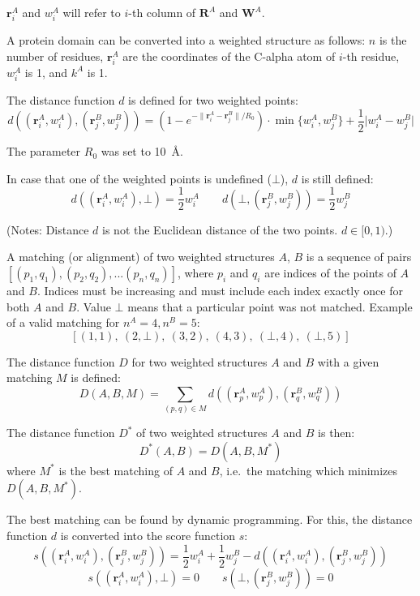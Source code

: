 \documentclass{article}
\begin{document}
\(\mathbf{r}^A_i\) and \(w^A_i\) will refer to \(i\)-th column of
\(\mathbf{R}^A\) and \(\mathbf{W}^A\).

A protein domain can be converted into a weighted structure as follows:
\(n\) is the number of residues, \(\mathbf{r}^A_i\) are the coordinates of the
C-alpha atom of \(i\)-th residue, \(w^A_i\) is 1, and \(k^A\) is 1.

The distance function \(d\) is defined for two weighted points:
  \[
    d \left( (\mathbf{r}^A_i, w^A_i), (\mathbf{r}^B_j, w^B_j) \right) 
    = \left( 1 - e^{-\lVert \mathbf{r}^A_i-\mathbf{r}^B_j \rVert / R_0} \right) \cdot \min\{ w^A_i, w^B_j \} + \frac{1}{2} \lvert w^A_i-w^B_j \rvert
  \]

The parameter \(R_0\) was set to 10~\AA.

In case that one of the weighted points is undefined (\(\bot\)), \(d\)
is still defined:
  \[
    d \left( (\mathbf{r}^A_i, w^A_i), \bot \right) = \frac{1}{2} w^A_i \qquad 
    d \left( \bot, (\mathbf{r}^B_j, w^B_j) \right) = \frac{1}{2} w^B_j
  \]

(Notes: Distance \(d\) is not the Euclidean distance of the two points.
\(d \in [0,1)\).)

A matching (or alignment) of two weighted structures \(A\), \(B\) is a sequence of
pairs \([(p_1, q_1), (p_2, q_2), \allowbreak ...\allowbreak(p_n, q_n)]\), 
where \(p_i\) and \(q_i\) are indices of the points of \(A\) and \(B\).
Indices must be increasing and must include each index exactly once for
both \(A\) and \(B\). Value \(\bot\) means that a particular point was
not matched. Example of a valid matching for \(n^A = 4, n^B = 5\):
  \[  [(1, 1),\ (2, \bot),\ (3, 2),\ (4, 3),\ (\bot, 4),\ (\bot, 5)]  \]
  
The distance function \(D\) for two weighted structures \(A\) and \(B\) with a given matching \(M\) is defined:
  \[  D(A, B, M) = \sum\limits_{(p, q) \in M}{d \left( (\mathbf{r}^A_{p}, w^A_{p}), (\mathbf{r}^B_{q}, w^B_{q}) \right)}  \]

  The distance function \(D^*\) of two weighted structures \(A\) and \(B\) is then:
  \[  D^*(A, B) = D(A, B, M^*)  \]
where \(M^*\) is the best matching of \(A\) and \(B\), i.e.~the matching which minimizes \(D(A, B, M^*)\).

The best matching can be found by dynamic programming. 
For this, the distance function \(d\) is converted into the score function \(s\):
  \[
    s \left( (\mathbf{r}^A_i, w^A_i), (\mathbf{r}^B_j, w^B_j) \right) 
    = \frac{1}{2} w^A_i + \frac{1}{2} w^B_j - d \left( (\mathbf{r}^A_i, w^A_i), (\mathbf{r}^B_j, w^B_j) \right)
  \]
  \[
    s \left( (\mathbf{r}^A_i, w^A_i), \bot \right) = 0 \qquad 
    s \left( \bot, (\mathbf{r}^B_j, w^B_j) \right) = 0
  \]
\end{document}
